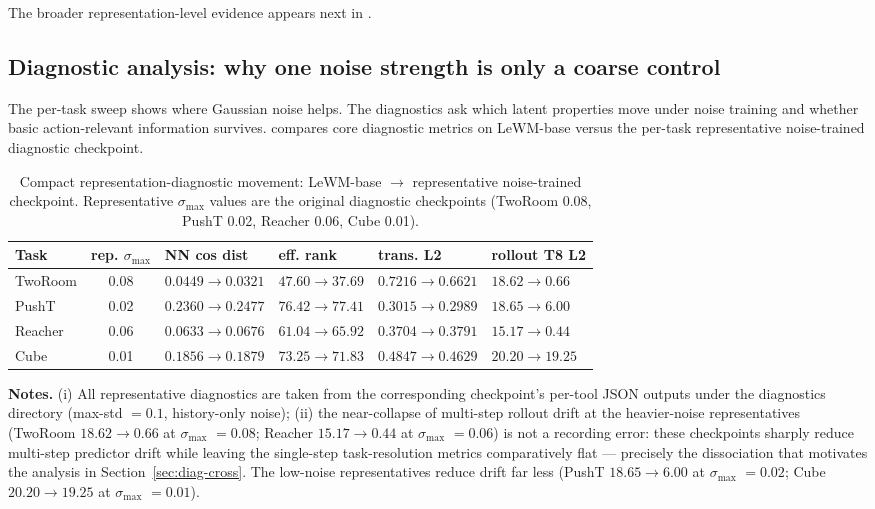 \documentclass[10pt]{article}
\newcommand{\stdmax}{\ensuremath{\sigma_{\max}}}
\begin{document}
The broader representation-level evidence appears next in .

\subsection{Diagnostic analysis: why one noise strength is only a coarse control}\label{sec:exp-diag}

The per-task sweep shows where Gaussian noise helps. The diagnostics ask which latent properties move under noise training and whether basic action-relevant information survives.  compares core diagnostic metrics on LeWM-base versus the per-task representative noise-trained diagnostic checkpoint.

\begin{table}[tbp]
\centering
\caption{Compact representation-diagnostic movement: LeWM-base $\to$ representative noise-trained checkpoint. Representative \stdmax{} values are the original diagnostic checkpoints (TwoRoom 0.08, PushT 0.02, Reacher 0.06, Cube 0.01).}
\label{tab:diag-base-vs-best}
\small
\setlength{\tabcolsep}{4pt}
\renewcommand{\arraystretch}{1.12}
\begin{tabularx}{\textwidth}{l c >{\centering\arraybackslash}X >{\centering\arraybackslash}X >{\centering\arraybackslash}X >{\centering\arraybackslash}X}
\toprule
Task & rep. \stdmax{} & NN cos dist & eff. rank & trans. L2 & rollout T8 L2 \\
\midrule
TwoRoom & 0.08 & $0.0449 \to 0.0321$ & $47.60 \to 37.69$ & $0.7216 \to 0.6621$ & $18.62 \to 0.66$ \\
PushT & 0.02 & $0.2360 \to 0.2477$ & $76.42 \to 77.41$ & $0.3015 \to 0.2989$ & $18.65 \to 6.00$ \\
Reacher & 0.06 & $0.0633 \to 0.0676$ & $61.04 \to 65.92$ & $0.3704 \to 0.3791$ & $15.17 \to 0.44$ \\
Cube & 0.01 & $0.1856 \to 0.1879$ & $73.25 \to 71.83$ & $0.4847 \to 0.4629$ & $20.20 \to 19.25$ \\
\bottomrule
\end{tabularx}
\end{table}

\noindent\textbf{Notes.} (i) All representative diagnostics are taken from the corresponding checkpoint's per-tool JSON outputs under the diagnostics directory (max-std $= 0.1$, history-only noise); (ii) the near-collapse of multi-step rollout drift at the heavier-noise representatives (TwoRoom $18.62 \to 0.66$ at \stdmax{} $= 0.08$; Reacher $15.17 \to 0.44$ at \stdmax{} $= 0.06$) is not a recording error: these checkpoints sharply reduce multi-step predictor drift while leaving the single-step task-resolution metrics comparatively flat --- precisely the dissociation that motivates the analysis in Section~\ref{sec:diag-cross}. The low-noise representatives reduce drift far less (PushT $18.65 \to 6.00$ at \stdmax{} $= 0.02$; Cube $20.20 \to 19.25$ at \stdmax{} $= 0.01$).
\end{document}
